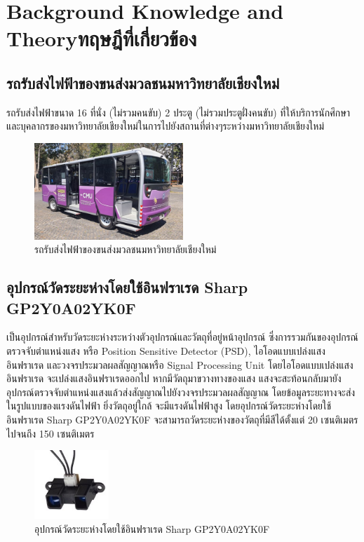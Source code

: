\chapter{\ifenglish Background Knowledge and Theory\else ทฤษฎีที่เกี่ยวข้อง\fi}

\section{รถรับส่งไฟฟ้าของขนส่งมวลชนมหาวิทยาลัยเชียงใหม่}
  รถรับส่งไฟฟ้าขนาด 16 ที่นั่ง (ไม่รวมคนขับ) 2 ประตู (ไม่รวมประตูฝั่งคนขับ) ที่ให้บริการนักศึกษาและบุคลากรของมหาวิทยาลัยเชียงใหม่ในการไปยังสถานที่ต่างๆระหว่างมหาวิทยาลัยเชียงใหม่
  \begin{figure}[h!]
    \begin{center}
      \includegraphics[width=0.5\textwidth]{cmu-evbus.jpg}
    \end{center}
    \caption[Poem]{รถรับส่งไฟฟ้าของขนส่งมวลชนมหาวิทยาลัยเชียงใหม่}
    \label{fig:cmu-ebus}
  \end{figure}

\section{อุปกรณ์วัดระยะห่างโดยใช้อินฟราเรด Sharp GP2Y0A02YK0F}
  \cite[อุปกรณ์วัดระยะห่างโดยใช้อินฟราเรด Sharp GP2Y0A02YK0F]{sharpgp2y0a02yk0f} เป็นอุปกรณ์สำหรับวัดระยะห่างระหว่างตัวอุปกรณ์และวัตถุที่อยู่หน้าอุปกรณ์ ซึ่งการรวมกันของอุปกรณ์ตรวจจับตำแหน่งแสง หรือ Position Sensitive Detector (PSD), ไอโอดแบบเปล่งแสงอินฟราเรด และวงจรประมวลผลสัญญาณหรือ Signal Processing Unit โดยไอโอดแบบเปล่งแสงอินฟราเรด จะเปล่งแสงอินฟราเรดออกไป หากมีวัตถุมาขวางทางของแสง แสงจะสะท้อนกลับมายังอุปกรณ์ตรวจจับตำแหน่งแสงแล้วส่งสัญญาณไปยังวงจรประมวลผลสัญญาณ โดยข้อมูลระยะทางจะส่งในรูปแบบของแรงดันไฟฟ้า ยิ่งวัตถุอยู่ใกล้ จะมีแรงดันไฟฟ้าสูง โดยอุปกรณ์วัดระยะห่างโดยใช้อินฟราเรด Sharp GP2Y0A02YK0F จะสามารถวัดระยะห่างของวัตถุที่มีสีได้ตั้งแต่ 20 เซนติเมตร ไปจนถึง 150 เซนติเมตร
  \begin{figure}[h!]
    \begin{center}
      \includegraphics[width=0.25\textwidth]{Sharp-GP2Y0A02YK0F.jpg}
    \end{center}
    \caption[Poem]{อุปกรณ์วัดระยะห่างโดยใช้อินฟราเรด Sharp GP2Y0A02YK0F}
    \label{fig:Sharp-GP2Y0A02YK0F}
  \end{figure}

